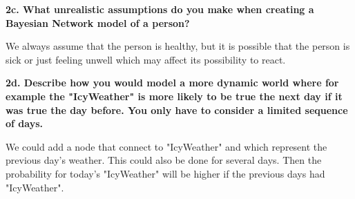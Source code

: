 \documentclass[a4paper,10pt]{article}
\begin{document}
 \textbf{2c. What unrealistic assumptions do you make when creating a Bayesian Network model of a person?}

 We always assume that the person is healthy, but it is possible that the person is sick or just feeling unwell which may affect its possibility to react.

\textbf{2d. Describe how you would model a more dynamic world where for example the "IcyWeather" is more likely to be true the next day if it was true the day before. 
You only have to consider a limited sequence of days.}

We could add a node that connect to "IcyWeather" and which represent the previous day's weather.
This could also be done for several days.
Then the probability for today's "IcyWeather" will be higher if the previous days had "IcyWeather".
\end{document}
